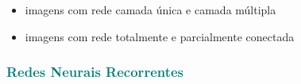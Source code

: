\documentclass{automatextcc}
\newcommand{\nico}[1]{\textcolor{teal}{#1}}
\begin{document}
\begin{itemize}
    \item imagens com rede camada única e camada múltipla
    \item imagens com rede totalmente e parcialmente conectada
\end{itemize}

\subsubsection{\nico{Redes Neurais Recorrentes}}


\end{document}
